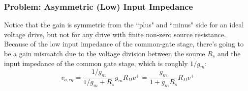 \subsubsection{Problem:  Asymmetric (Low) Input Impedance}
Notice that the gain is symmetric from the ``plus" and ``minus" side for an ideal voltage drive, but not for any drive with finite non-zero source resistance.  Because of the low input impedance of the common-gate stage, there's going to be a gain mismatch due to the voltage division between the source $R_s$ and the input impedance of the common gate stage, which is roughly $1/g_m$:
\begin{equation}
	v_{o,cg} = \frac{1/g_m}{1/g_m + R_s} g_m R_D  v^+ = \frac{g_m}{1 + g_m R_s}  R_D  v^+
\end{equation} 

